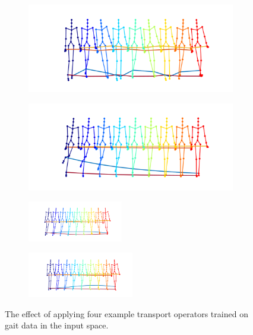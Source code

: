 \documentclass[letterpaper]{article} %
\begin{document}
\begin{figure}[ht]

\centering
\begin{subfigure}[b]{0.62\columnwidth}
\centering
{\includegraphics[width=0.99\columnwidth]{gaitTransOpt_1.png}}
\caption{}
\label{subfig:inputGait1}
\end{subfigure}
\vspace{-1.21mm}
\begin{subfigure}[b]{0.62\columnwidth}
\centering
{\includegraphics[width=0.99\columnwidth]{gaitTransOpt_2.png}}
\caption{}
\label{subfig:inputGait2}
\end{subfigure}
\begin{subfigure}[b]{0.62\columnwidth}
\centering
\includegraphics[width=0.8019000000000001\columnwidth,height=0.7in ]{gaitTransOpt_4.png}
\caption{}
\label{subfig:inputGait4}
\end{subfigure}
\vspace{-1.21mm}
\begin{subfigure}[b]{0.62\columnwidth}
\centering
\includegraphics[width=0.891\columnwidth,height=0.78in ]{gaitTransOpt_8.png}
\caption{}
\label{subfig:inputGait8}
\end{subfigure}




\caption{\label{fig:inputGait} The effect of applying four example transport operators trained on gait data in the input space. }

\end{figure}
\end{document}
